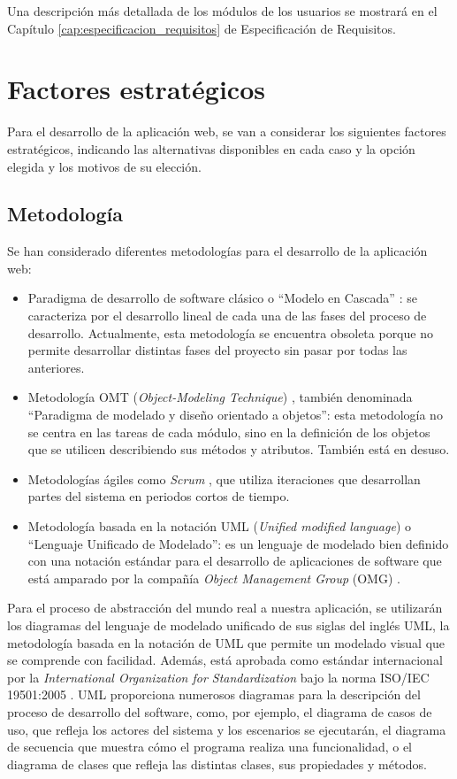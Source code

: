 Una descripción más detallada de los módulos de los usuarios se mostrará en el Capítulo \ref{cap:especificacion_requisitos} de Especificación de Requisitos.


\section{Factores estratégicos} \label{sec:estrategicos}

Para el desarrollo de la aplicación web, se van a considerar los siguientes factores estratégicos, indicando las alternativas disponibles en cada caso y la opción elegida y los motivos de su elección.


\subsection{Metodología}


Se han considerado diferentes metodologías para el desarrollo de la aplicación web:
\begin{itemize}
    \item  Paradigma de desarrollo de software clásico o ``Modelo en Cascada'' \cite{pressman}:  se caracteriza por el desarrollo lineal de cada una de las fases del proceso de desarrollo. Actualmente, esta metodología se encuentra obsoleta porque no permite desarrollar distintas fases del proyecto sin pasar por todas las anteriores.
    \item Metodología OMT (\textit{Object-Modeling Technique}) \cite{omt}, también denominada ``Paradigma de modelado y diseño orientado a objetos'': esta metodología no se centra en las tareas de cada módulo, sino en la definición de los objetos que se utilicen describiendo sus métodos y atributos. También está en desuso.
    \item Metodologías ágiles como \textit{Scrum} \cite{scrum}, que utiliza iteraciones que desarrollan partes del sistema en periodos cortos de tiempo.
    \item Metodología basada en la notación UML (\textit{Unified modified language})\cite{uml} o ``Lenguaje Unificado de Modelado'':  es un lenguaje de modelado bien definido con una notación estándar para el desarrollo de aplicaciones de software que está amparado por la compañía \textit{Object Management Group} (OMG) \cite{omg}. 
\end{itemize}

Para el proceso de abstracción del mundo real a nuestra aplicación, se utilizarán los diagramas del lenguaje de modelado unificado de sus siglas del inglés UML, la metodología basada en la notación de UML que permite un modelado visual que se comprende con facilidad. Además, está aprobada como estándar internacional por la \textit{International Organization for Standardization} bajo la norma ISO/IEC 19501:2005 \cite{iso19501}. UML proporciona numerosos diagramas para la descripción del proceso de desarrollo del software, como, por ejemplo, el diagrama de casos de uso, que refleja los actores del sistema y los escenarios se ejecutarán, el diagrama de secuencia que muestra cómo el programa realiza una funcionalidad, o el diagrama de clases que refleja las distintas clases, sus propiedades y métodos.


